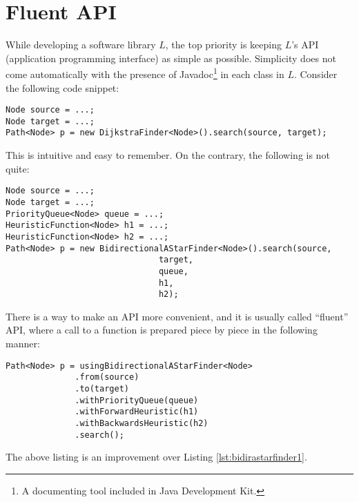 \documentclass[oneside]{book}
\begin{document}
\section{Fluent API}
While developing a software library $L$, the top priority is keeping $L$'s API (application programming interface) as simple as possible. Simplicity does not come automatically with the presence of Javadoc\footnote{A documenting tool included in Java Development Kit.} in each class in $L$. Consider the following code snippet:
\begin{lstlisting}
Node source = ...;
Node target = ...;
Path<Node> p = new DijkstraFinder<Node>().search(source, target);
\end{lstlisting}
\newpage
\noindent This is intuitive and easy to remember. On the contrary, the following is not quite:
\begin{lstlisting}[caption={Too much arguments for a method call},label=lst:bidirastarfinder1]
Node source = ...;
Node target = ...;
PriorityQueue<Node> queue = ...;
HeuristicFunction<Node> h1 = ...;
HeuristicFunction<Node> h2 = ...;
Path<Node> p = new BidirectionalAStarFinder<Node>().search(source, 
							   target, 
							   queue, 
							   h1, 
							   h2);
\end{lstlisting}
There is a way to make an API more convenient, and it is usually called ``fluent'' API, where a call to a function is prepared piece by piece in the following manner:
\begin{lstlisting}
Path<Node> p = usingBidirectionalAStarFinder<Node>
              .from(source)
              .to(target)
              .withPriorityQueue(queue)
              .withForwardHeuristic(h1)
              .withBackwardsHeuristic(h2)
              .search();
\end{lstlisting}
The above listing is an improvement over Listing \ref{lst:bidirastarfinder1}.
\end{document}
